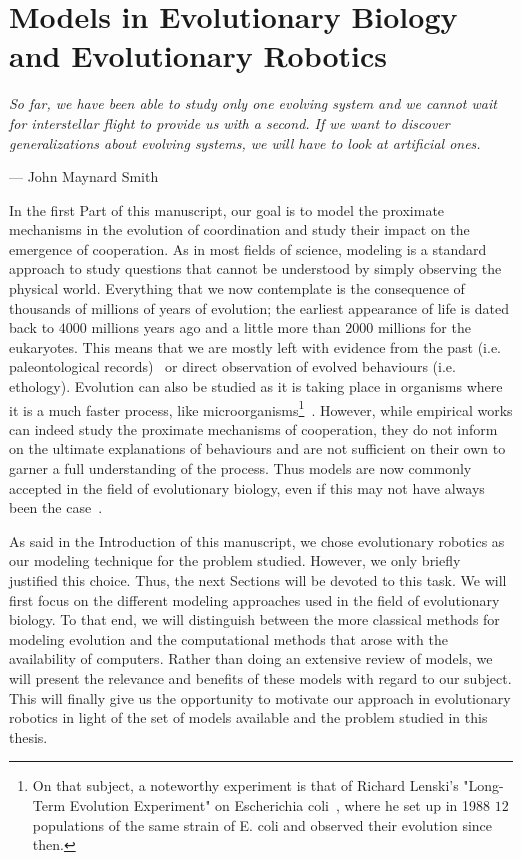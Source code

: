 \chapter{Models in Evolutionary Biology and Evolutionary Robotics}
\label{chapter:model}

\epigraph{\textit{So far, we have been able to study only one evolving system and we cannot wait for interstellar flight to provide us with a second. If we want to discover generalizations about evolving systems, we will have to look at artificial ones.}}{--- \textup{John Maynard Smith}}

\minitoc[n] %

In the first Part of this manuscript, our goal is to model the proximate mechanisms in the evolution of coordination and study their impact on the emergence of cooperation. As in most fields of science, modeling is a standard approach to study questions that cannot be understood by simply observing the physical world. Everything that we now contemplate is the consequence of thousands of millions of years of evolution; the earliest appearance of life is dated back to $4000$ millions years ago and a little more than $2000$ millions for the eukaryotes. This means that we are mostly left with evidence from the past (i.e. paleontological records)~\parencite{Aiello1995, Wrangham1999} or direct observation of evolved behaviours (i.e. ethology). Evolution can also be studied as it is taking place in organisms where it is a much faster process, like microorganisms\footnote{On that subject, a noteworthy experiment is that of Richard Lenski's "Long-Term Evolution Experiment" on Escherichia coli~\parencite{Fox2015}, where he set up in 1988 $12$ populations of the same strain of E. coli and observed their evolution since then.}~\parencite{Elena2003}. However, while empirical works can indeed study the proximate mechanisms of cooperation, they do not inform on the ultimate explanations of behaviours and are not sufficient on their own to garner a full understanding of the process. Thus models are now commonly accepted in the field of evolutionary biology, even if this may not have always been the case~\parencite{Shou2015}. 

As said in the Introduction of this manuscript, we chose evolutionary robotics as our modeling technique for the problem studied. However, we only briefly justified this choice. Thus, the next Sections will be devoted to this task. We will first focus on the different modeling approaches used in the field of evolutionary biology. To that end, we will distinguish between the more classical methods for modeling evolution and the computational methods that arose with the availability of computers. Rather than doing an extensive review of models, we will present the relevance and benefits of these models with regard to our subject. This will finally give us the opportunity to motivate our approach in evolutionary robotics in light of the set of models available and the problem studied in this thesis.


